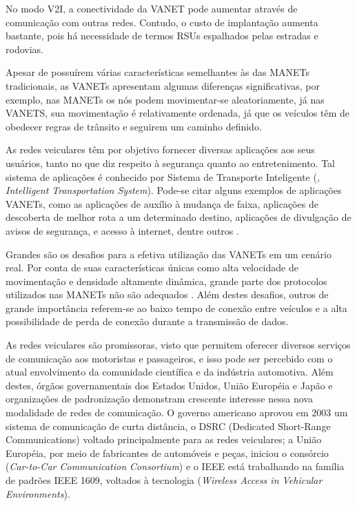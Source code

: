 No modo V2I, a conectividade da VANET pode aumentar através de comunicação com
outras redes. Contudo, o custo de implantação aumenta bastante, pois há
necessidade de termos RSUs espalhados pelas estradas e rodovias.

Apesar de possuírem várias características semelhantes às das MANETs
tradicionais, as VANETs apresentam algumas diferenças significativas, por
exemplo, nas MANETs os nós podem movimentar-se aleatoriamente, já nas VANETS,
sua movimentação é relativamente ordenada, já que os veículos têm de obedecer
regras de trânsito e seguirem um caminho definido.

As redes veiculares têm por objetivo fornecer diversas aplicações aos seus
usuários, tanto no que diz respeito à segurança quanto ao entretenimento. Tal
sistema de aplicações é conhecido por Sistema de Transporte Inteligente
(, \textit{Intelligent
Transportation System}). Pode-se citar alguns exemplos de aplicações
VANETs, como as aplicações de auxílio à mudança de faixa, aplicações de
descoberta de melhor rota a um determinado destino, aplicações de divulgação de
avisos de segurança, e acesso à internet, dentre outros \cite{li2007routing}.

Grandes são os desafios para a efetiva utilização das VANETs em um cenário
real. Por conta de suas características únicas como alta velocidade de
movimentação e densidade altamente dinâmica, grande parte dos protocolos
utilizados nas MANETs não são adequados \cite{taha2007vanet}. Além destes 
desafios, outros de grande importância referem-se ao baixo tempo de conexão 
entre veículos e a alta possibilidade de perda de conexão durante a 
transmissão de dados.

As redes veiculares são promissoras, visto que permitem oferecer diversos
serviços de comunicação aos motoristas e passageiros, e isso pode ser percebido
com o atual envolvimento da comunidade científica e da indústria automotiva.
Além destes, órgãos governamentais dos Estados Unidos, União Européia e Japão e
organizações de padronização demonstram crescente interesse nessa nova
modalidade de redes de comunicação. O governo americano aprovou em $2003$ um
sistema de comunicação de curta distância, o DSRC (Dedicated
Short-Range Communications) voltado principalmente para as redes veiculares;
a União Européia, por meio de fabricantes de automóveis e peças, iniciou o
consórcio 
(\textit{Car-to-Car Communication Consortium}) e o IEEE está trabalhando na
família de padrões IEEE 1609, voltados à tecnologia
(\textit{Wireless Access in Vehicular Environments}).

